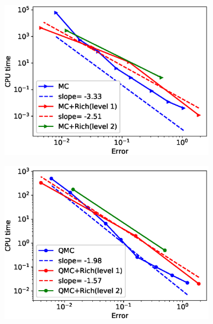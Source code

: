 \FloatBarrier
\begin{figure}[htb]
	\centering %
	\begin{subfigure}{0.33\textwidth}
		\includegraphics[width=\linewidth]{./figures/rBergomi_Complexity_rates/set2/error_vs_time_set2_MC_comparison}
		\caption{}
		\label{fig:1}
	\end{subfigure}\hfil %
	\begin{subfigure}{0.33\textwidth}
		\includegraphics[width=\linewidth]{./figures/rBergomi_Complexity_rates/set2/error_vs_time_set2_QMC_comparison}
		\caption{}
		\label{fig:2}
	\end{subfigure}\hfil %
	\begin{subfigure}{0.33\textwidth}

\end{subfigure}
\end{figure}
